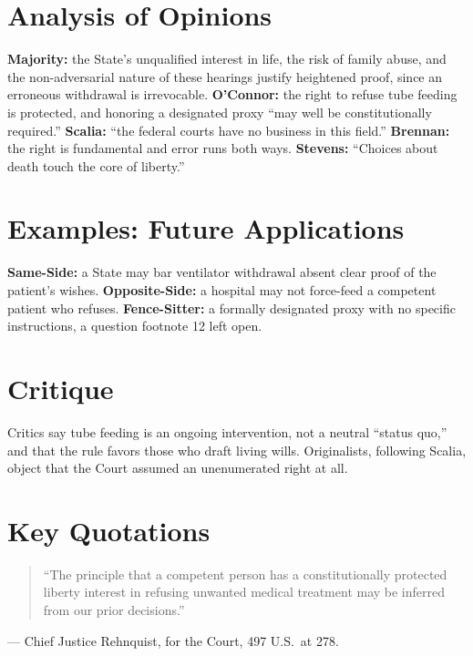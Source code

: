 \documentclass[12pt]{article}
\begin{document}
\section{Analysis of Opinions}
\textbf{Majority:} the State's unqualified interest in life, the risk of family abuse, and the non-adversarial nature of these hearings justify heightened proof, since an erroneous withdrawal is irrevocable. \textbf{O'Connor:} the right to refuse tube feeding is protected, and honoring a designated proxy ``may well be constitutionally required.'' \textbf{Scalia:} ``the federal courts have no business in this field.'' \textbf{Brennan:} the right is fundamental and error runs both ways. \textbf{Stevens:} ``Choices about death touch the core of liberty.''

\section{Examples: Future Applications}
\textbf{Same-Side:} a State may bar ventilator withdrawal absent clear proof of the patient's wishes. \textbf{Opposite-Side:} a hospital may not force-feed a competent patient who refuses. \textbf{Fence-Sitter:} a formally designated proxy with no specific instructions, a question footnote 12 left open.

\section{Critique}
Critics say tube feeding is an ongoing intervention, not a neutral ``status quo,'' and that the rule favors those who draft living wills. Originalists, following Scalia, object that the Court assumed an unenumerated right at all.

\section{Key Quotations}
\begin{quote}
``The principle that a competent person has a constitutionally protected liberty interest in refusing unwanted medical treatment may be inferred from our prior decisions.''
\end{quote}
\noindent --- Chief Justice Rehnquist, for the Court, 497 U.S.\ at 278.
\end{document}

